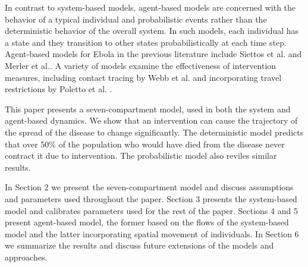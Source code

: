 In contrast to system-based models, agent-based models are concerned with the behavior of a typical individual and probabilistic events rather than the deterministic behavior of the overall system. In such models, each individual has a state and they transition to other states probabilistically at each time step. Agent-based models for Ebola in the previous literature include Siettos et al. \cite{Siettos2015} and Merler et al.\cite{Merler2015}. A variety of models examine the effectiveness of intervention measures, including contact tracing by Webb et al. \cite{Webb2015} and incorporating travel restrictions by Poletto et al. \cite{Poletto2014}.

This paper presents a seven-compartment model, used in both the system and agent-based dynamics. We show that an intervention can cause the trajectory of the spread of the disease to change significantly. The deterministic model predicts that over 50\% of the population who would have died from the disease never contract it due to intervention. The probabilistic model also reviles similar results. 

In Section 2 we present the seven-compartment model and discuss assumptions and parameters used throughout the paper. Section 3 presents the system-based model and calibrates parameters used for the rest of the paper. Sections 4 and 5 present agent-based model, the former based on the flows of the system-based model and the latter incorporating spatial movement of individuals. In Section 6  we summarize the results and discuss future extensions of the models and approaches.  
